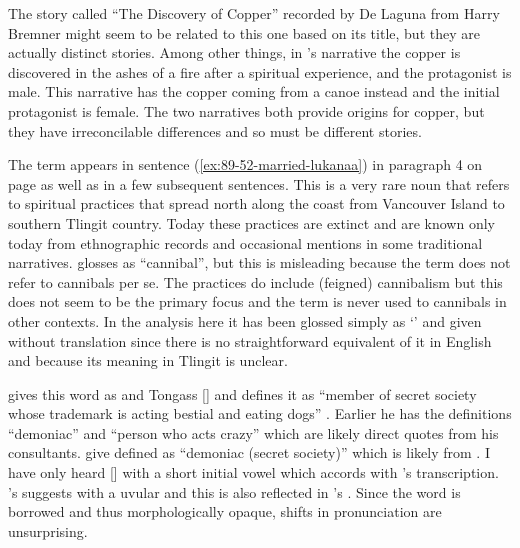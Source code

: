 The story called “The Discovery of Copper” recorded by De Laguna from  Harry Bremner \parencite[899–900]{de-laguna:1972} might seem to be related to this one based on its title, but they are actually distinct stories.
Among other things, in ’s narrative the copper is discovered in the ashes of a fire after a spiritual experience, and the protagonist is male.
This narrative has the copper coming from a canoe instead and the initial protagonist is female.
The two narratives both provide origins for copper, but they have irreconcilable differences and so must be different stories.

The term  appears in sentence (\ref{ex:89-52-married-lukanaa}) in paragraph 4 on page \pageref{ex:89-52-married-lukanaa} as well as in a few subsequent sentences.
This is a very rare noun that refers to spiritual practices that spread north along the coast from Vancouver Island to southern Tlingit country.
Today these practices are extinct and are known only today from ethnographic records and occasional mentions in some traditional narratives.
\citeauthor{swanton:1909} glosses  as “cannibal”, but this is misleading because the term does not refer to cannibals per se.
The  practices do include (feigned) cannibalism but this does not seem to be the primary focus and the term  is never used to cannibals in other contexts.
In the analysis here it has been glossed simply as ‘’ and given without translation since there is no straightforward equivalent of it in English and because its meaning in Tlingit is unclear.

\citeauthor{leer:1978b} gives this word as  and Tongass  [] and defines it as “member of secret society whose trademark is acting bestial and eating dogs” \parencite[16]{leer:1978b}.
Earlier he has the definitions “demoniac” and “person who acts crazy” \parencite[04/33]{leer:1973} which are likely direct quotes from his consultants.
\citeauthor{naish-story:1976} give  defined as “demoniac (secret society)” \parencite[93]{naish-story:1976} which is likely from \citeauthor{leer:1973}.
I have only heard  [] with a short initial vowel which accords with \citeauthor{swanton:1909}’s transcription.
\citeauthor{swanton:1909}’s  suggests  with a uvular and this is also reflected in \citeauthor{mcclellan:1975b}’s  \parencite[567]{mcclellan:1975b}.
Since the word is borrowed and thus morphologically opaque, shifts in pronunciation are unsurprising.

